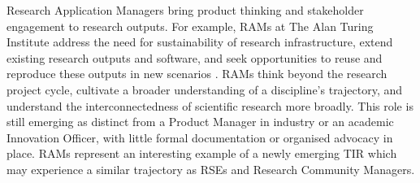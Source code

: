 \documentclass[authordate,meta,issue]{jote-new-article}
\begin{document}
Research Application Managers \parencites[RAMs;][]{TheTuringWayCommunityRecord2022a} bring product thinking and stakeholder engagement to research outputs. For example, RAMs at The Alan Turing Institute address the need for sustainability of research infrastructure, extend existing research outputs and software, and seek opportunities to reuse and reproduce these outputs in new scenarios \parencites{TheTuringWayCommunityRecord2022a}. RAMs think beyond the research project cycle, cultivate a broader understanding of a discipline's trajectory, and understand the interconnectedness of scientific research more broadly. This role is still emerging as distinct from a Product Manager in industry or an academic Innovation Officer, with little formal documentation or organised advocacy in place. RAMs represent an interesting example of a newly emerging TIR which may experience a similar trajectory as RSEs and Research Community Managers.
\end{document}
